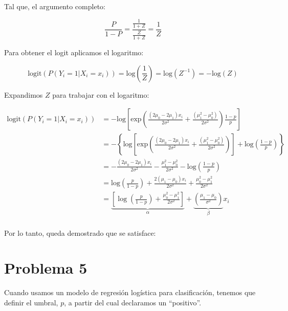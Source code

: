 Tal que, el argumento completo:

\begin{equation*}
    \frac{P}{1-P}=\frac{\frac{1}{1+Z}}{\frac{Z}{1+Z}}=\frac{1}{Z}
\end{equation*}

Para obtener el logit aplicamos el logaritmo:

\begin{equation*}
    \text{logit}(P(Y_i=1|X_i=x_i))=\text{log} \left(\frac{1}{Z}\right)=\text{log}(Z^{-1})=-\text{log}(Z)
\end{equation*}

Expandimos $Z$ para trabajar con el logaritmo:

\begin{align*}
    \text{logit}(P(Y_i=1|X_i=x_i))&=-\text{log}\left[\text{exp}\left(\frac{(2\mu_0-2\mu_1)x_i}{2\sigma^2}+\frac{(\mu_1^2-\mu_0^2)}{2\sigma^2}\right)\frac{1-p}{p}\right]\\[0.1cm]
    &=-\left\{\text{log}\left[\text{exp}\left(\frac{(2\mu_0-2\mu_1)x_i}{2\sigma^2}+\frac{(\mu_1^2-\mu_0^2)}{2\sigma^2}\right)\right]+\text{log}\left(\frac{1-p}{p}\right)\right\}\\[0.1cm]
    &=-\frac{(2\mu_0-2\mu_1)x_i}{2\sigma^2}-\frac{\mu_1^2-\mu_0^2}{2\sigma^2}-\text{log}\left(\frac{1-p}{p}\right)\\[0.1cm]
    &=\text{log}\left(\frac{p}{1-p}\right)+\frac{2(\mu_1-\mu_0)x_i}{2\sigma^2}+\frac{\mu_0^2-\mu_1^2}{2\sigma^2}\\[0.1cm]
    &=\underbrace{\left[\log\left(\frac{p}{1-p}\right) + \frac{\mu_0^2-\mu_1^2}{2\sigma^2}\right]}_{\alpha} + \underbrace{\left(\frac{\mu_1-\mu_0}{\sigma^2}\right)}_{\beta} x_i\\[0.1cm]
\end{align*}

Por lo tanto, queda demostrado que se satisface:

\begin{center}
\end{center}

\newpage

\section*{Problema \textcolor{CIMATRed}{5}}

Cuando usamos un modelo de regresión logística para clasificación, tenemos que definir el umbral, $p$, a partir del cual declaramos un ``positivo''.

